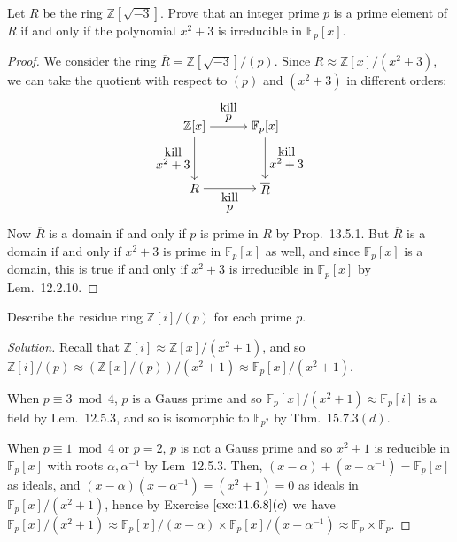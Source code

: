 \documentclass[12pt]{article}
\theoremstyle{remark}
\begin{document}
\begin{problem}
  Let $R$ be the ring $\mathbb{Z}[\sqrt{-3}]$. Prove that an integer prime $p$ is a prime element of $R$ if and only if the polynomial $x^2+3$ is irreducible in $\mathbb{F}_p[x]$.
\end{problem}
\begin{proof}
  We consider the ring $\overline{R} = \mathbb{Z}[\sqrt{-3}]/(p)$. Since $R \approx \mathbb{Z}[x]/(x^2+3)$, we can take the quotient with respect to $(p)$ and $(x^2+3)$ in different orders:
  \begin{equation*}
    \begin{tikzpicture}[node distance=2cm,auto,commutative diagrams/every diagram]
      \node (A) {$\mathbb{Z}[x]$};
      \node (B) [right of=A] {$\mathbb{F}_p[x]$};
      \node (C) [below of=A,yshift=0.25cm] {$R$};
      \node (D) [below of=B,yshift=0.25cm] {$\overline{R}$};
      \draw[commutative diagrams/rightarrow] (A) to node [align=center]{kill\\[-0.5em]$p$} (B);
      \draw[commutative diagrams/rightarrow] (A) to node [align=center][swap]{kill\\[-0.2em]$x^2+3$} (C);
      \draw[commutative diagrams/rightarrow] (B) to node [align=center]{kill\\[-0.2em]$x^2+3$} (D);
      \draw[commutative diagrams/rightarrow] (C) to node [align=center][swap]{kill\\[-0.5em]$p$} (D);
    \end{tikzpicture} 
  \end{equation*}
  Now $\overline{R}$ is a domain if and only if $p$ is prime in $R$ by Prop.~13.5.1. But $\overline{R}$ is a domain if and only if $x^2+3$ is prime in $\mathbb{F}_p[x]$ as well, and since $\mathbb{F}_p[x]$ is a domain, this is true if and only if $x^2+3$ is irreducible in $\mathbb{F}_p[x]$ by Lem.~12.2.10.
\end{proof}

\begin{problem}
  Describe the residue ring $\mathbb{Z}[i]/(p)$ for each prime $p$.
\end{problem}
\begin{proof}[Solution]
  Recall that $\mathbb{Z}[i] \approx \mathbb{Z}[x]/(x^2+1)$, and so $\mathbb{Z}[i]/(p) \approx (\mathbb{Z}[x]/(p))/(x^2+1) \approx \mathbb{F}_p[x]/(x^2+1)$.
  \par When $p \equiv 3 \bmod 4$, $p$ is a Gauss prime and so $\mathbb{F}_p[x]/(x^2+1) \approx \mathbb{F}_p[i]$ is a field by Lem.~$12.5.3$, and so is isomorphic to $\mathbb{F}_{p^2}$ by Thm.~$15.7.3(d)$.
  \par When $p \equiv 1 \bmod 4$ or $p = 2$, $p$ is not a Gauss prime and so $x^2+1$ is reducible in $\mathbb{F}_p[x]$ with roots $\alpha,\alpha^{-1}$ by Lem~12.5.3. Then, $(x-\alpha) + (x-\alpha^{-1}) = \mathbb{F}_p[x]$ as ideals, and $(x-\alpha)(x-\alpha^{-1}) = (x^2+1) = 0$ as ideals in $\mathbb{F}_p[x]/(x^2+1)$, hence by Exercise $\ref{exc:11.6.8}(c)$ we have $\mathbb{F}_p[x]/(x^2+1) \approx \mathbb{F}_p[x]/(x-\alpha) \times \mathbb{F}_p[x]/(x-\alpha^{-1}) \approx \mathbb{F}_p \times \mathbb{F}_p$.
\end{proof}
\end{document}
